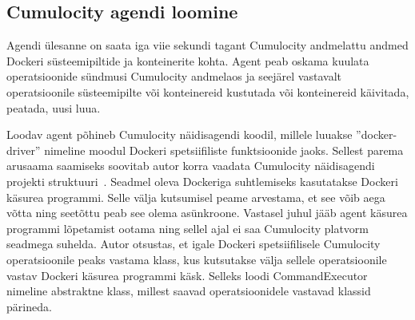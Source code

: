 \documentclass[12pt]{article}
\begin{document}
  \FloatBarrier
 
 
   
 
 
 
  
 
 
 
 
 
 
  \subsection{Cumulocity agendi loomine}
  Agendi ülesanne on saata iga viie sekundi tagant Cumulocity andmelattu andmed
  Dockeri süsteemipiltide ja konteinerite kohta. Agent peab oskama kuulata
  operatsioonide sündmusi Cumulocity andmelaos ja seejärel vastavalt operatsioonile
  süsteemipilte või konteinereid kustutada või konteinereid käivitada, peatada, uusi luua.
 
  Loodav agent põhineb Cumulocity näidisagendi koodil, millele luuakse ''docker-driver''
  nimeline moodul Dockeri spetsiifiliste
  funktsioonide jaoks. Sellest parema arusaama saamiseks soovitab autor korra vaadata
  Cumulocity näidisagendi projekti struktuuri~\cite{cumulocityExamplesRepository}.
  Seadmel oleva Dockeriga suhtlemiseks kasutatakse Dockeri käsurea
  programmi.
  Selle välja kutsumisel peame arvestama, et see võib aega võtta ning
  seetõttu peab see olema asünkroone.
  Vastasel juhul jääb agent käsurea programmi lõpetamist ootama ning sellel ajal ei saa Cumulocity
  platvorm seadmega suhelda. Autor otsustas, et igale Dockeri spetsiifilisele Cumulocity
  operatsioonile peaks vastama klass, kus kutsutakse välja sellele operatsioonile vastav
  Dockeri käsurea programmi käsk. Selleks loodi CommandExecutor nimeline abstraktne klass,
  millest saavad operatsioonidele vastavad klassid pärineda.
 
 
 
 
\end{document}
